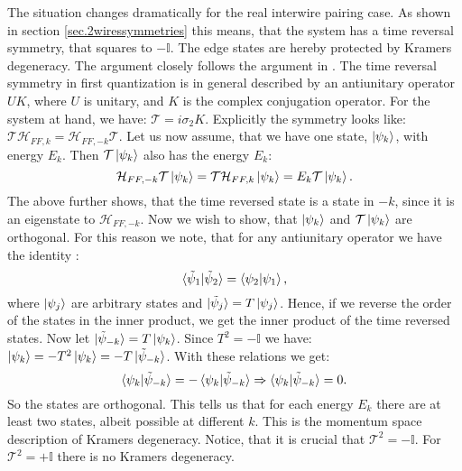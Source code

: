 The situation changes dramatically for the real interwire pairing case. As shown in section \ref{sec.2wiressymmetries} this means, that the system has a time reversal symmetry, that squares to $-\mathbb{I}$. The edge states are hereby protected by Kramers degeneracy. The argument closely follows the argument in \cite{BernevigTITSC}. The time reversal symmetry in first quantization is in general described by an antiunitary operator $UK$, where $U$ is unitary, and $K$ is the complex conjugation operator. For the system at hand, we have: $\mathcal{T} = i\sigma_2 K$. Explicitly the symmetry looks like: $\mathcal{T}\mathcal{H}_{FF,k} = \mathcal{H}_{FF,-k}\mathcal{T}$. Let us now assume, that we have one state, $\ket{\psi_k}$, with energy $E_k$. Then $\mathcal{T}\ket{\psi_k}$ also has the energy $E_k$:
\begin{equation}
\mathcal{H}_{FF,-k}\mathcal{T}\ket{\psi_k} = \mathcal{T}\mathcal{H}_{FF,k}\ket{\psi_k} = E_k\mathcal{T}\ket{\psi_k}. \nonumber
\end{equation}
The above further shows, that the time reversed state is a state in $-k$, since it is an eigenstate to $\mathcal{H}_{FF,-k}$. Now we wish to show, that $\ket{\psi_k}$ and $\mathcal{T}\ket{\psi_k}$ are orthogonal. For this reason we note, that for any antiunitary operator we have the identity \cite{Sakurai, BernevigTITSC}:
\begin{equation}
\braket{\tilde{\psi}_1| \tilde{\psi}_2} = \braket{\psi_2|\psi_1}, \nonumber
\end{equation} 
where $\ket{\psi_j}$ are arbitrary states and $\ket{\tilde{\psi}_j} = T\ket{\psi_j}$. Hence, if we reverse the order of the states in the inner product, we get the inner product of the time reversed states. Now let $\ket{\tilde{\psi}_{-k}} = T\ket{\psi_k}$. Since $T^2 = - \mathbb{I}$ we have: $\ket{\psi_k} = -T^2\ket{\psi_k}= -T\ket{\tilde{\psi}_{-k}}$. With these relations we get:
\begin{equation}
\braket{\psi_k|\tilde{\psi}_{-k}} = -\braket{\psi_k|\tilde{\psi}_{-k}} \Rightarrow \braket{\psi_k|\tilde{\psi}_{-k}} = 0. 
\end{equation}
So the states are orthogonal. This tells us that for each energy $E_k$ there are at least two states, albeit possible at different $k$. This is the momentum space description of Kramers degeneracy. Notice, that it is crucial that $\mathcal{T}^2 = -\mathbb{I}$. For $\mathcal{T}^2 = +\mathbb{I}$ there is no Kramers degeneracy. 

